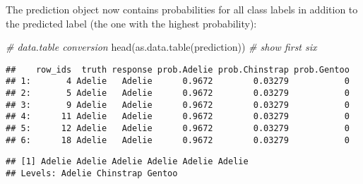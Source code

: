 \documentclass[
]{scrbook}
\newenvironment{Shaded}{\begin{snugshade}}{\end{snugshade}}
\newcommand{\AttributeTok}[1]{\textcolor[rgb]{0.77,0.63,0.00}{#1}}
\newcommand{\CommentTok}[1]{\textcolor[rgb]{0.56,0.35,0.01}{\textit{#1}}}
\newcommand{\FunctionTok}[1]{\textcolor[rgb]{0.00,0.00,0.00}{#1}}
\newcommand{\NormalTok}[1]{#1}
\newcommand{\OtherTok}[1]{\textcolor[rgb]{0.56,0.35,0.01}{#1}}
\newcommand{\SpecialCharTok}[1]{\textcolor[rgb]{0.00,0.00,0.00}{#1}}
\newcommand{\StringTok}[1]{\textcolor[rgb]{0.31,0.60,0.02}{#1}}
\renewenvironment{Shaded} {\begin{snugshade}\small} {\end{snugshade}}
\begin{document}
\begin{Shaded}
\end{Shaded}

The prediction object now contains probabilities for all class labels in addition to the predicted label (the one with the highest probability):

\begin{Shaded}
\begin{Highlighting}[]
\CommentTok{\# data.table conversion}
\FunctionTok{head}\NormalTok{(}\FunctionTok{as.data.table}\NormalTok{(prediction)) }\CommentTok{\# show first six}
\end{Highlighting}
\end{Shaded}

\begin{verbatim}
##    row_ids  truth response prob.Adelie prob.Chinstrap prob.Gentoo
## 1:       4 Adelie   Adelie      0.9672        0.03279           0
## 2:       5 Adelie   Adelie      0.9672        0.03279           0
## 3:       9 Adelie   Adelie      0.9672        0.03279           0
## 4:      11 Adelie   Adelie      0.9672        0.03279           0
## 5:      12 Adelie   Adelie      0.9672        0.03279           0
## 6:      18 Adelie   Adelie      0.9672        0.03279           0
\end{verbatim}

\begin{Shaded}
\end{Shaded}

\begin{verbatim}
## [1] Adelie Adelie Adelie Adelie Adelie Adelie
## Levels: Adelie Chinstrap Gentoo
\end{verbatim}
\end{document}
